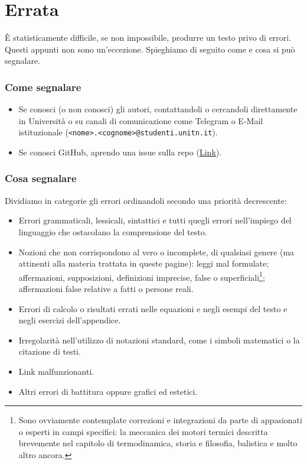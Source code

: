 \section*{Errata}
È statisticamente difficile, se non impossibile, produrre un testo
privo di errori. Questi appunti non sono un'eccezione.
Spieghiamo di seguito come e cosa si può segnalare.

\subsubsection*{Come segnalare}
\begin{itemize}
    \item Se conosci (o non conosci) gli autori, contattandoli o cercandoli direttamente in Università
    o su canali di comunicazione come Telegram o E-Mail istituzionale
    (\texttt{<nome>.<cognome>@studenti.unitn.it}).

    \item Se conosci GitHub, aprendo una issue sulla repo (\href{https://github.com/zenosaltt/phy}{\faGithub \space Link}).

\end{itemize}

\subsubsection*{Cosa segnalare}
Dividiamo in categorie gli errori ordinandoli secondo una priorità
decrescente:

\begin{itemize}
    \item Errori grammaticali, lessicali, sintattici e tutti quegli errori nell'impiego
    del linguaggio che ostacolano la comprensione del testo.

    \item Nozioni che non corrispondono al vero o incomplete, di qualsiasi genere (ma
    attinenti alla materia trattata in queste pagine):
    leggi mal formulate; affermazioni, supposizioni, definizioni imprecise, false o
    superficiali\footnote{Sono ovviamente contemplate correzioni e integrazioni da parte di appasionati
    o esperti in campi specifici: la meccanica dei motori termici descritta brevemente
    nel capitolo di termodinamica, storia e filosofia, balistica e molto altro ancora.}; affermazioni false
    relative a fatti o persone reali.

    \item Errori di calcolo o risultati errati nelle equazioni e negli esempi del testo e negli
    esercizi dell'appendice.

    \item Irregolarità nell'utilizzo di notazioni standard, come i simboli matematici
    o la citazione di testi.

    \item Link malfunzionanti.
    
    \item Altri errori di battitura oppure grafici ed estetici.
\end{itemize}

